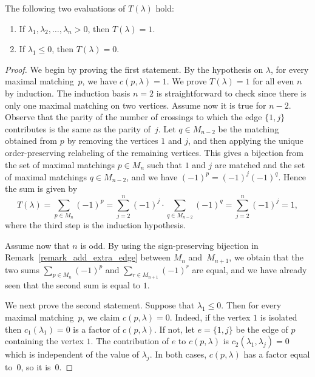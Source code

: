 \begin{lemma}
The following two evaluations of $T(\lambda)$ hold:
\begin{enumerate}
\item\label{lemma7.3_1} If $\lambda_{1},\lambda_{2},\ldots,\lambda_{n}>0$, then $T(\lambda)=1$.
\item\label{lemma7.3_2} If $\lambda_{1}\leq 0$, then $T(\lambda)=0$.
\end{enumerate}
\label{lemma_T_two_statements}
\end{lemma}
\begin{proof}
We begin by proving the first statement.
By the hypothesis on $\lambda$, for every maximal matching~$p$,
we have $c(p,\lambda)=1$.
We prove 
$T(\lambda) = 1$ for all even $n$ by induction.
The induction basis $n=2$ is straightforward to check
since there is only one maximal matching on two vertices.
Assume now it is true for $n-2$.
Observe that the parity of the number 
of crossings to which the edge $\{1,j\}$ contributes is
the same as the parity of~$j$. 
Let $q \in M_{n-2}$ be the matching obtained from $p$ by removing
the vertices $1$ and $j$, and then applying 
the unique order-preserving relabeling of the remaining vertices.
This gives a bijection from the set of maximal matchings $p\in M_{n}$ such that
$1$ and $j$ are matched and the set of maximal matchings $q\in M_{n-2}$, and we
have $(-1)^p=(-1)^j (-1)^q$.
Hence the sum is given by
$$
T(\lambda)
=
\sum_{p \in M_{n}} (-1)^{p}
=
\sum_{j=2}^{n}  (-1)^{j} \cdot \sum_{q \in M_{n-2}} (-1)^{q}
=
\sum_{j=2}^{n}  (-1)^{j} 
=
1 ,
$$
where the third step is the induction hypothesis.

Assume now that $n$ is odd.
By using the sign-preserving bijection in
Remark~\ref{remark_add_extra_edge}
between $M_{n}$ and~$M_{n+1}$,
we obtain that
the two sums
$\sum_{p \in M_{n}} (-1)^{p}$
and
$\sum_{r \in M_{n+1}} (-1)^{r}$
are equal, and we have already seen that the second sum is equal to $1$.



We next prove the second statement.
Suppose that $\lambda_{1} \leq 0$. 
Then for every maximal matching~$p$, we claim $c(p,\lambda)=0$. 
Indeed, if the vertex $1$ is isolated then
$c_{1}(\lambda_{1}) = 0$ is a factor of $c(p, \lambda)$.
If not, let $e = \{1,j\}$ be the edge of $p$ containing the vertex $1$.
The contribution of $e$ to $c(p,\lambda)$ is $c_{2}(\lambda_{1},\lambda_{j})=0$
which is independent of the value of $\lambda_{j}$.
In both cases, $c(p,\lambda)$ has a factor equal to~$0$, so it is~$0$. 
\end{proof}

